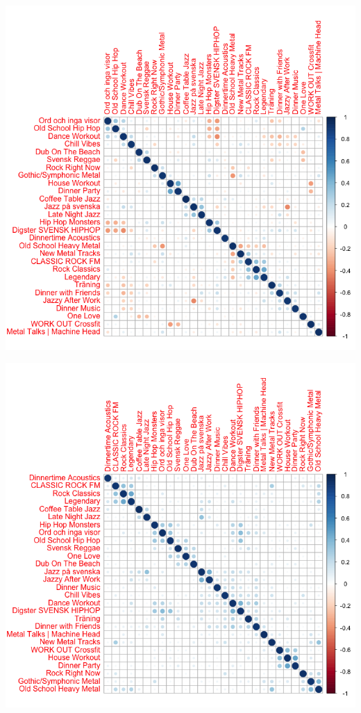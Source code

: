 \documentclass[a4paper,11pt]{kth-mag}
\begin{document}
\includegraphics[scale=0.6]{images/sum.png}

\includegraphics[scale=0.6]{images/absSum.png}
\end{document}
